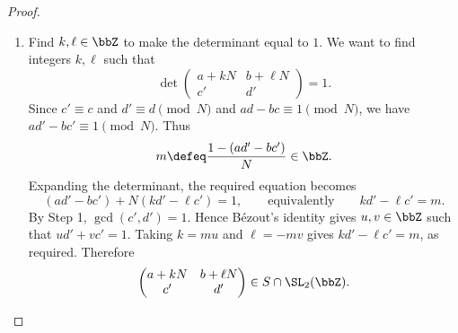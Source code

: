 \begin{proof}
\begin{enumerate}[label=(\arabic*)]
\begin{enumerate}[label=\textit{Step~\arabic*.}]
            The argument is symmetric in $c$ and $d$. Moreover, $c$ and $d$ cannot both be zero, since $ad - bc \equiv 1\pmod N$. Thus, without loss of generality, assume $c \ne 0$ and take $s = 0$. In other words, put $c' = c$ and look for
            \[
                d' = d + tN\qquad\text{with}\qquad\gcd(c, d + tN) = 1.
            \]
            By the Chinese remainder theorem, there exists $t \in \bbZ$ such that
            \[
                \boxed{\begin{cases}
                    t \equiv 1\pmod p, & \text{for every prime }p \mid g, \\
                    t \equiv 0\pmod p, & \text{for every prime }p \mid c\text{ with }p \nmid g.
                \end{cases}}
            \]
            We now check that $\gcd(c, d + tN) = 1$. Let $p$ be any prime divisor of $c$.
            \begin{itemize}[leftmargin=2em, nosep]
                \item If $p \mid g$, then $p \mid d$ but $p \nmid N$, since $\gcd(g, N) = 1$. Hence
                \[
                    d + tN \equiv N\not \equiv 0\pmod p.
                \]
                \item If $p \nmid g$, then $p \nmid d$, and the choice $t \equiv 0\pmod p$ gives
                \[
                    d + tN \equiv d\not \equiv 0\pmod p.
                \]
            \end{itemize}
            Thus no prime divisor of $c$ divides $d + tN$, proving
            \[
                \boxed{\gcd(c', d') = \gcd(c, d + tN) = 1.}
            \]

            \item Find $k, \ell \in \bbZ$ to make the determinant equal to $1$.
            We want to find integers $k, \ell$ such that
            \[
                \det\begin{pmatrix}a + kN & b + \ell N\\ c' & d'\end{pmatrix} = 1.
            \]
            Since $c' \equiv c$ and $d' \equiv d\pmod N$ and $ad - bc \equiv 1\pmod N$, we have $ad' - bc' \equiv 1\pmod N$. Thus
            \[
                m \defeq \frac{1 - (ad' - bc')}{N} \in \bbZ.
            \]
            Expanding the determinant, the required equation becomes
            \[
                (ad' - bc') + N(kd' - \ell c') = 1,
                \qquad\text{equivalently}\qquad kd' - \ell c' = m.
            \]
            By Step 1, $\gcd(c', d') = 1$. Hence B\'ezout's identity gives $u, v \in \bbZ$ such that $ud' + vc' = 1$. Taking $k = mu$ and $\ell = - mv$ gives $kd' - \ell c' = m$, as required. Therefore
            \[
                \begin{pmatrix}a + kN & b + \ell N\\ c' & d'\end{pmatrix}
                \in S \cap \SL_2(\bbZ).
            \]
        \end{enumerate}


\end{enumerate}
\end{proof}
